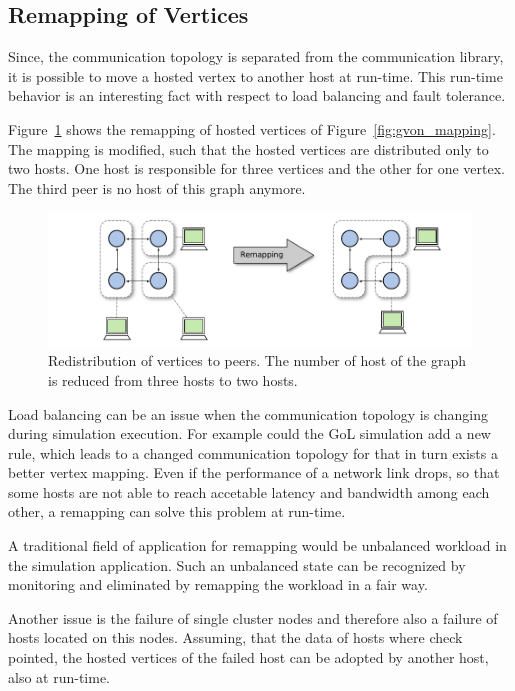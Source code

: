 \subsection{Remapping of Vertices}
\label{sec:remapping}
Since, the communication topology is separated from the communication
library, it is possible to move a hosted vertex to another host at
run-time.  This run-time behavior is an interesting fact with respect
to load balancing and fault tolerance.


Figure~\ref{fig:gvon_remapping} shows the remapping of
hosted vertices of Figure~\ref{fig:gvon_mapping}. The mapping is modified, such that the
hosted vertices are distributed only to two hosts. One host is responsible for three
vertices and the other for one vertex. The third peer is no host of this
graph anymore.

\begin{figure}[H]
  \centering
  \includegraphics[width=\textwidth]{graphics/30_gvon_remapping}
  \caption{Redistribution of vertices to peers. The number of host of
    the graph is reduced from three hosts to two hosts.}
  \label{fig:gvon_remapping}
\end{figure}

Load balancing can be an issue when the communication topology is
changing during simulation execution. For example could the GoL
simulation add a new rule, which leads to a changed communication
topology for that in turn exists a better vertex mapping.  Even if the
performance of a network link drops, so that some hosts are not able
to reach accetable latency and bandwidth among each other, a
remapping can solve this problem at run-time.

A traditional field of application for remapping would be unbalanced
workload in the simulation application. Such an unbalanced state can
be recognized by monitoring and eliminated by remapping the workload
in a fair way.

Another issue is the failure of single cluster nodes and therefore
also a failure of hosts located on this nodes. Assuming, that the data
of hosts where check pointed, the hosted vertices of the failed host
can be adopted by another host, also at run-time.

